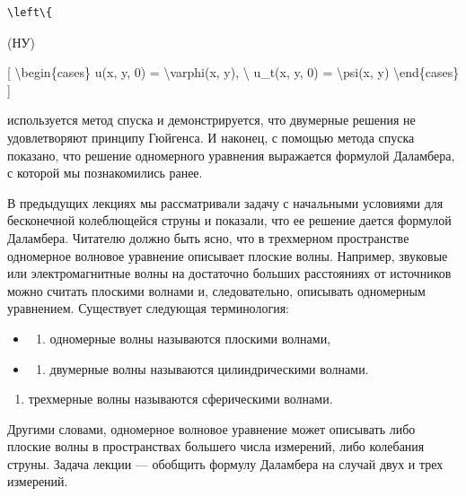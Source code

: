 \documentclass[
]{article}
\providecommand{\tightlist}{%
  \setlength{\itemsep}{0pt}\setlength{\parskip}{0pt}}
\begin{document}
\begin{verbatim}
\left\{
\end{verbatim}

(НУ)

{[} \textbackslash begin\{cases\} u(x, y, 0) = \textbackslash varphi(x,
y), \textbackslash{} u\_t(x, y, 0) = \textbackslash psi(x, y)
\textbackslash end\{cases\} {]}

используется метод спуска и демонстрируется, что двумерные решения не
удовлетворяют принципу Гюйгенса. И наконец, с помощью метода спуска
показано, что решение одномерного уравнения выражается формулой
Даламбера, с которой мы познакомились ранее.

В предыдущих лекциях мы рассматривали задачу с начальными условиями для
бесконечной колеблющейся струны и показали, что ее решение дается
формулой Даламбера. Читателю должно быть ясно, что в трехмерном
пространстве одномерное волновое уравнение описывает плоские волны.
Например, звуковые или электромагнитные волны на достаточно больших
расстояниях от источников можно считать плоскими волнами и,
следовательно, описывать одномерным уравнением. Существует следующая
терминология:

\begin{itemize}
\tightlist
\item
  \begin{enumerate}
  \def\labelenumi{\arabic{enumi})}
  \tightlist
  \item
    одномерные волны называются плоскими волнами,
  \end{enumerate}
\item
  \begin{enumerate}
  \def\labelenumi{\arabic{enumi})}
  \setcounter{enumi}{1}
  \tightlist
  \item
    двумерные волны называются цилиндрическими волнами.
  \end{enumerate}
\end{itemize}

\begin{enumerate}
\def\labelenumi{\arabic{enumi})}
\setcounter{enumi}{2}
\tightlist
\item
  трехмерные волны называются сферическими волнами.
\end{enumerate}

Другими словами, одномерное волновое уравнение может описывать либо
плоские волны в пространствах большего числа измерений, либо колебания
струны. Задача лекции --- обобщить формулу Даламбера на случай двух и
трех измерений.
\end{document}
